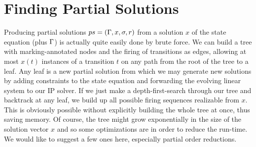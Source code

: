 \documentclass{LMCS}
\begin{document}
\section{Finding Partial Solutions}\label{sec5}

Producing partial solutions $ps=({\Gamma},x,\sigma,r)$ from a solution $x$ of the state equation (plus ${\Gamma}$) is actually
quite easily done by brute force. We can build a tree with marking-annotated nodes and the firing of transitions as edges,
allowing at most $x(t)$ instances of a transition $t$ on any path from the root of the tree to a leaf. Any leaf is
a new partial solution from which we may generate new solutions by adding constraints to the state equation and
forwarding the evolving linear system to our IP solver. If we just make a depth-first-search through our tree and
backtrack at any leaf, we build up all possible firing sequences realizable from $x$. This is obviously possible
without explicitly building the whole tree at once, thus saving memory.
Of course, the tree might grow exponentially in the size of the solution vector $x$ and so some optimizations
are in order to reduce the run-time. We would like to suggest a few ones here, especially partial order reductions.
\end{document}
